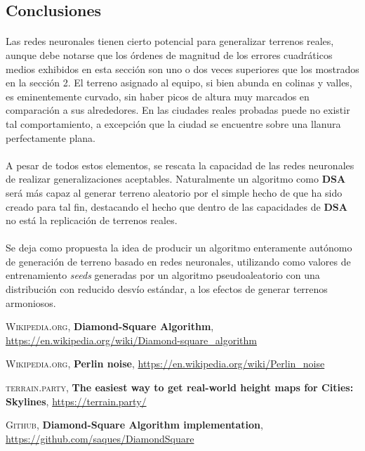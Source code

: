 \documentclass[12pt, twocolumn]{article}
\begin{document}
	\subsection{Conclusiones}
	
	\paragraph{} Las redes neuronales tienen cierto potencial para generalizar terrenos reales, aunque debe notarse que los órdenes de magnitud de los errores cuadráticos medios exhibidos en esta sección son uno o dos veces superiores que los mostrados en la sección 2. El terreno asignado al equipo, si bien abunda en colinas y valles, es eminentemente curvado, sin haber picos de altura muy marcados en comparación a sus alrededores. En las ciudades reales probadas puede no existir tal comportamiento, a excepción que la ciudad se encuentre sobre una llanura perfectamente plana. 
	
	\paragraph{} A pesar de todos estos elementos, se rescata la capacidad de las redes neuronales de realizar generalizaciones aceptables. Naturalmente un algoritmo como \textbf{DSA} será más capaz al generar terreno aleatorio por el simple hecho de que ha sido creado para tal fin, destacando el hecho que dentro de las capacidades de \textbf{DSA} no está la replicación de terrenos reales. 
	
	\paragraph{} Se deja como propuesta la idea de producir un algoritmo enteramente autónomo de generación de terreno basado en redes neuronales, utilizando como valores de entrenamiento \textit{seeds} generadas por un algoritmo pseudoaleatorio con una distribución con reducido desvío estándar, a los efectos de generar terrenos armoniosos.
	
	
	
	
	
	\newpage
	
	\begin{thebibliography}{9}
		
		\textsc{Wikipedia.org}, \textbf{Diamond-Square Algorithm},
		\url{https://en.wikipedia.org/wiki/Diamond-square_algorithm}
		
		\textsc{Wikipedia.org}, \textbf{Perlin noise},
		\url{https://en.wikipedia.org/wiki/Perlin_noise}
		
		\textsc{terrain.party}, \textbf{The easiest way to get real-world height maps for Cities: Skylines},
		\url{https://terrain.party/}
		
		\textsc{Github}, \textbf{Diamond-Square Algorithm implementation},
		\url{https://github.com/saques/DiamondSquare}
		
	\end{thebibliography}

	
	
	
	
	
	
\end{document}
